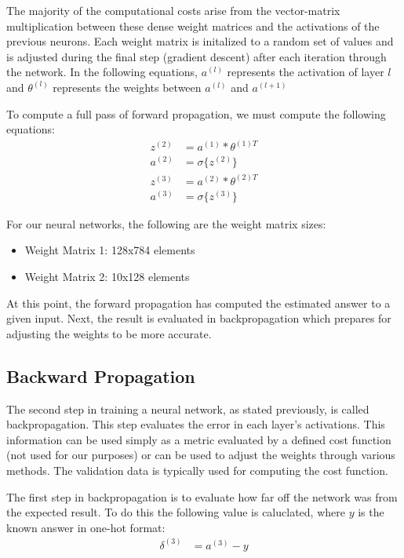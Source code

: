 \documentclass[11pt]{article}
\begin{document}
The majority of the computational costs arise from the vector-matrix multiplication between these dense weight matrices and the activations of the previous neurons. Each weight matrix is initalized to a random set of values and is adjusted during the final step (gradient descent) after each iteration through the network. In the following equations, $a^{(l)}$ represents the activation of layer $l$ and $\theta^{(l)}$ represents the weights between $a^{(l)}$ and $a^{(l+1)}$
 
To compute a full pass of forward propagation, we must compute the following equations:
\begin{align*}
	z^{(2)} & = a^{(1)}*\theta^{(1)T} \\
	a^{(2)} & = \sigma\{z^{(2)}\}     \\
	z^{(3)} & = a^{(2)}*\theta^{(2)T} \\
	a^{(3)} & = \sigma\{z^{(3)}\}     
\end{align*}

For our neural networks, the following are the weight matrix sizes:
\begin{itemize}
	\item Weight Matrix 1: 128x784 elements
	\item Weight Matrix 2: 10x128 elements
\end{itemize}

At this point, the forward propagation has computed the estimated answer to a given input. Next, the result is evaluated in backpropagation which prepares for adjusting the weights to be more accurate.

\subsection{Backward Propagation}
The second step in training a neural network, as stated previously, is called backpropagation. This step evaluates the error in each layer's activations. This information can be used simply as a metric evaluated by a defined cost function (not used for our purposes) or can be used to adjust the weights through various methods. The validation data is typically used for computing the cost function.

The first step in backpropagation is to evaluate how far off the network was from the expected result. To do this the following value is caluclated, where $y$ is the known answer in one-hot format:
\begin{align*}
	\delta^{(3)} & = a^{(3)} - y 
\end{align*}
\end{document}
